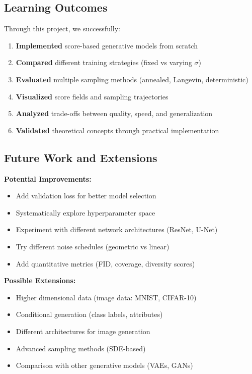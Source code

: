 \documentclass[12pt,a4paper]{article}
\begin{document}
\subsection{Learning Outcomes}

Through this project, we successfully:

\begin{enumerate}
    \item \textbf{Implemented} score-based generative models from scratch
    \item \textbf{Compared} different training strategies (fixed vs varying $\sigma$)
    \item \textbf{Evaluated} multiple sampling methods (annealed, Langevin, deterministic)
    \item \textbf{Visualized} score fields and sampling trajectories
    \item \textbf{Analyzed} trade-offs between quality, speed, and generalization
    \item \textbf{Validated} theoretical concepts through practical implementation
\end{enumerate}

\subsection{Future Work and Extensions}

\textbf{Potential Improvements:}
\begin{itemize}
    \item Add validation loss for better model selection
    \item Systematically explore hyperparameter space
    \item Experiment with different network architectures (ResNet, U-Net)
    \item Try different noise schedules (geometric vs linear)
    \item Add quantitative metrics (FID, coverage, diversity scores)
\end{itemize}

\textbf{Possible Extensions:}
\begin{itemize}
    \item Higher dimensional data (image data: MNIST, CIFAR-10)
    \item Conditional generation (class labels, attributes)
    \item Different architectures for image generation
    \item Advanced sampling methods (SDE-based)
    \item Comparison with other generative models (VAEs, GANs)
\end{itemize}
\end{document}
